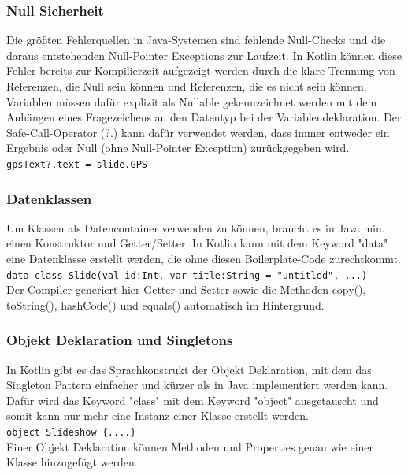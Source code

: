 \documentclass{sigchi-ext}
\begin{document}
\subsubsection{Null Sicherheit}
Die größten Fehlerquellen in Java-Systemen sind fehlende Null-Checks und die daraus entstehenden Null-Pointer Exceptions zur Laufzeit. In Kotlin können diese Fehler bereits zur Kompilierzeit aufgezeigt werden durch die klare Trennung von Referenzen, die Null sein können und Referenzen, die es nicht sein können. Variablen müssen dafür explizit als Nullable gekennzeichnet werden mit dem Anhängen eines Fragezeichens an den Datentyp bei der Variablendeklaration. Der Safe-Call-Operator (?.) kann dafür verwendet werden, dass immer entweder ein Ergebnis oder Null (ohne Null-Pointer Exception) zurückgegeben wird. \cite{moskala2017android} \\ \texttt{gpsText?.text = slide.GPS} \\ 

\subsubsection{Datenklassen}
Um Klassen als Datencontainer verwenden zu können, braucht es in Java min. einen Konstruktor und Getter/Setter. In Kotlin kann mit dem Keyword "data" eine Datenklasse erstellt werden, die ohne diesen Boilerplate-Code zurechtkommt. \\ \texttt{data class Slide(val id:Int,
                 var title:String = "untitled", ...)} \\ Der Compiler generiert hier Getter und Setter sowie die Methoden copy(), toString(), hashCode() und equals() automatisch im Hintergrund.
\cite{samuel2017programming} 

\subsubsection{Objekt Deklaration und Singletons}
In Kotlin gibt es das Sprachkonstrukt der Objekt Deklaration, mit dem das Singleton Pattern einfacher und kürzer als in Java implementiert werden kann. Dafür wird das Keyword "class" mit dem Keyword "object" ausgetauscht und somit kann nur mehr eine Instanz einer Klasse erstellt werden. \\\texttt{object Slideshow \{....\}} \\Einer Objekt Deklaration können Methoden und Properties genau wie einer Klasse hinzugefügt werden. \cite{moskala2017android} 
\end{document}
